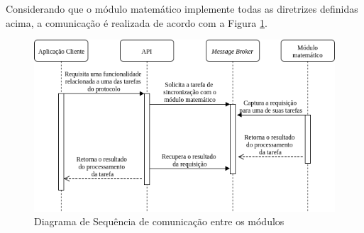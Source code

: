 	
	Considerando que o módulo matemático implemente todas as diretrizes definidas acima, a comunicação é realizada de acordo 
	com a Figura \ref{fig:sequence_diagram}.
	  


	\begin{figure}[h]
	\centering
	\includegraphics[scale=0.7]{figuras/sequence_diagram.png}
	\caption{Diagrama de Sequência de comunicação entre os módulos}
	\label{fig:sequence_diagram}
	\end{figure}



